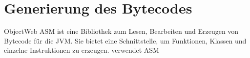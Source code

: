 \chapter{Generierung des Bytecodes}
\label{cha:asm}

ObjectWeb ASM ist eine Bibliothek zum Lesen, Bearbeiten und Erzeugen von Bytecode für die JVM. Sie bietet eine Schnittstelle, um Funktionen, Klassen und einzelne Instruktionen zu erzeugen. \toya verwendet ASM 
